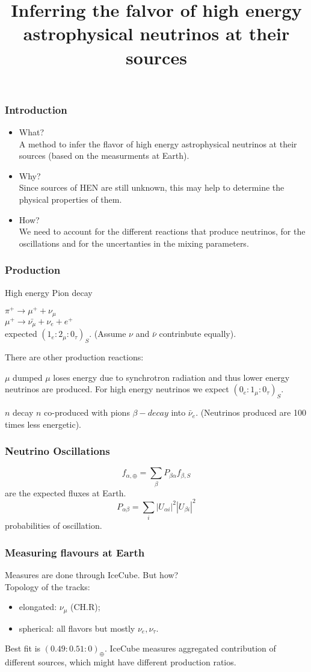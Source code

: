 \documentclass{beamer}
\title{Inferring the falvor of high energy astrophysical neutrinos at their sources}
\begin{document}
	\begin{frame}
		\frametitle{Introduction}
		\begin{itemize}
			\item What?
			\\
			A method to infer the flavor of high energy astrophysical neutrinos at their sources (based on the measurments at Earth).
			\item Why?\\
			Since sources of HEN are still unknown, this may help to determine the physical properties of them.
			\item How?\\
			We need to account for the different reactions that produce neutrinos, for the oscillations and for the uncertanties in the mixing parameters.
		\end{itemize}
	\end{frame}
	\frametitle{Production}
	\begin{alertblock}{High energy Pion decay}
		\begin{center}
			$\pi^+\rightarrow \mu^++\nu_\mu$	\\
			$\mu^+\rightarrow\bar{\nu_\mu}+\nu_e+e^+$\\
			expected $(1_e:2_\mu:0_\tau)_S$. (Assume $\nu$ and $\bar\nu$ contrinbute equally).
		\end{center}
	\end{alertblock}
	There are other production reactions:
	\begin{block}{$\mu$ dumped}
		$\mu$ loses energy due to synchrotron radiation and thus lower energy neutrinos are produced. For high energy neutrinos we expect $(0_e:1_\mu:0_\tau)_S$.
	\end{block}
	\begin{block}{$n$ decay}
		$n$ co-produced with pions $\beta-decay$ into $\bar\nu_e$. (Neutrinos produced are 100 times less energetic).
	\end{block}
	\begin{frame}
		\frametitle{Neutrino Oscillations}
		$$f_{\alpha,\oplus}=\sum_\beta P_{\beta\alpha}f_{\beta,S}$$ are the expected fluxes at Earth.
		$$P_{\alpha\beta}=\sum_{i}|U_{\alpha i}|^2|U_{\beta i}|^2$$ probabilities of oscillation.
	\end{frame}
	\begin{frame}
		\frametitle{Measuring flavours at Earth}
		Measures are done through IceCube. But how?  \\
		Topology of the tracks:
		\begin{itemize}
			\item elongated: $\nu_\mu$ (CH.R);
			\item spherical: all flavors but mostly $\nu_e,\nu_\tau$.
		\end{itemize}
		Best fit is $(0.49:0.51:0)_\oplus$.
		IceCube measures aggregated contribution of different sources, which might have different production ratios.
	\end{frame}
\end{document}
